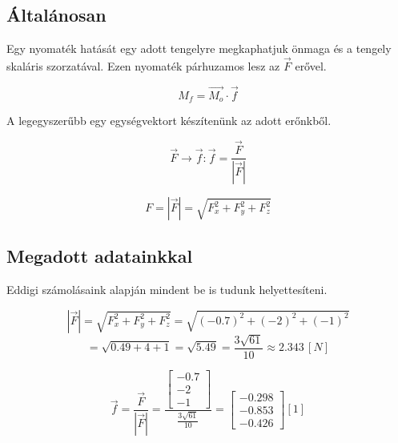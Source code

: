 
\subsection{Általánosan}

Egy nyomaték hatását egy adott tengelyre megkaphatjuk önmaga és a tengely skaláris szorzatával. Ezen nyomaték párhuzamos lesz az $\vec{F}$ erővel.

$$M_f = \vec{M_o} \cdot \vec{f}$$

A legegyszerűbb egy egységvektort készítenünk az adott erőnkből.

$$\vec{F} \rightarrow \vec{f}: \vec{f} = \frac{\vec{F}}{|\vec{F}|}$$

$$F = |\vec{F}| = \sqrt{F_x^2 + F_y^2 + F_z^2}$$

\subsection{Megadott adatainkkal}

Eddigi számolásaink alapján mindent be is tudunk helyettesíteni.

$$|\vec{F}| = \sqrt{F_x^2 + F_y^2 + F_z^2} = \sqrt{(-0.7)^2 + (-2)^2 + (-1)^2}$$ 
$$= \sqrt{0.49 + 4 + 1} = \sqrt{5.49} = \frac{3\sqrt{61}}{10} \approx 2.343 \, [\si{N}]$$

$$\vec{f} = \frac{\vec{F}}{|\vec{F}|} = \frac{\begin{bmatrix} -0.7 \\ -2 \\ -1 \end{bmatrix}}{\frac{3\sqrt{61}}{10}} = \begin{bmatrix} -0.298 \\ -0.853 \\ -0.426 \end{bmatrix} [\si{1}]$$

\begin{center}
\end{center}

